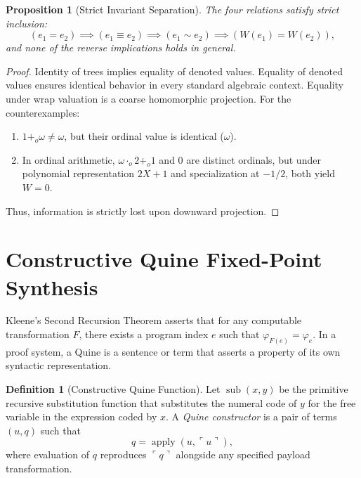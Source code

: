 \documentclass[11pt]{article}
\newtheorem{proposition}[theorem]{Proposition}
\theoremstyle{definition}
\newtheorem{definition}[theorem]{Definition}
\newcommand{\code}[1]{\ulcorner #1\urcorner}
\begin{document}
\begin{proposition}[Strict Invariant Separation]
The four relations satisfy strict inclusion:
\[
(e_1 = e_2) \implies (e_1 \equiv e_2) \implies (e_1 \sim e_2) \implies (W(e_1) = W(e_2)),
\]
and none of the reverse implications holds in general.
\end{proposition}
\begin{proof}
Identity of trees implies equality of denoted values. Equality of denoted values ensures identical behavior in every standard algebraic context. Equality under wrap valuation is a coarse homomorphic projection. For the counterexamples:
\begin{enumerate}
\item $1 +_o \omega \ne \omega$, but their ordinal value is identical ($\omega$).
\item In ordinal arithmetic, $\omega \cdot_o 2 +_o 1$ and $0$ are distinct ordinals, but under polynomial representation $2X + 1$ and specialization at $-1/2$, both yield $W = 0$.
\end{enumerate}
Thus, information is strictly lost upon downward projection.
\end{proof}

\section{Constructive Quine Fixed-Point Synthesis}
Kleene's Second Recursion Theorem asserts that for any computable transformation $F$, there exists a program index $e$ such that $\varphi_{F(e)} = \varphi_e$. In a proof system, a Quine is a sentence or term that asserts a property of its own syntactic representation.

\begin{definition}[Constructive Quine Function]
Let $\operatorname{sub}(x, y)$ be the primitive recursive substitution function that substitutes the numeral code of $y$ for the free variable in the expression coded by $x$. A \emph{Quine constructor} is a pair of terms $(u, q)$ such that
\[
q = \operatorname{apply}(u, \code{u}),
\]
where evaluation of $q$ reproduces $\code{q}$ alongside any specified payload transformation.
\end{definition}
\end{document}

